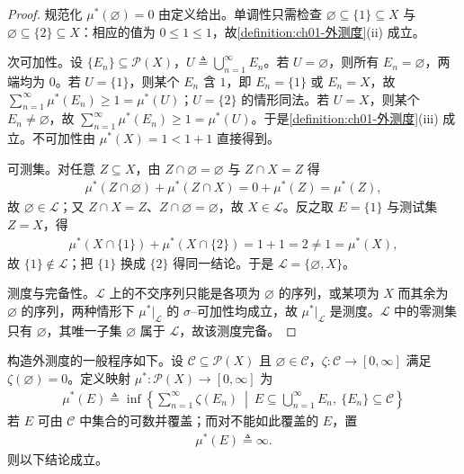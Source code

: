 \documentclass[../../main.tex]{subfiles}%
\begin{document}
\begin{proof}
规范化 $\mu^*(\varnothing )=0$ 由定义给出。单调性只需检查 $\varnothing\subseteq\{1\}\subseteq X$ 与 $\varnothing\subseteq\{2\}\subseteq X$：相应的值为 $0\leqslant 1\leqslant 1$，故\cref{definition:ch01-外测度}(ii) 成立。

次可加性。设 $\{E_n\}\subseteq\mathcal{P}(X)$，$U\triangleq\bigcup_{n=1}^\infty E_n$。若 $U=\varnothing$，则所有 $E_n=\varnothing$，两端均为 $0$。若 $U=\{1\}$，则某个 $E_n$ 含 $1$，即 $E_n=\{1\}$ 或 $E_n=X$，故 $\sum_{n=1}^\infty\mu^*(E_n)\geqslant 1=\mu^*(U)$；$U=\{2\}$ 的情形同法。若 $U=X$，则某个 $E_n\neq\varnothing$，故 $\sum_{n=1}^\infty\mu^*(E_n)\geqslant 1=\mu^*(U)$。于是\cref{definition:ch01-外测度}(iii) 成立。不可加性由 $\mu^*(X)=1<1+1$ 直接得到。

可测集。对任意 $Z\subseteq X$，由 $Z\cap\varnothing=\varnothing$ 与 $Z\cap X=Z$ 得
\begin{align*}
\mu^*(Z\cap\varnothing )+\mu^*(Z\cap X)=0+\mu^*(Z)=\mu^*(Z),
\end{align*}
故 $\varnothing\in\mathcal{L}$；又 $Z\cap X=Z$、$Z\cap\varnothing=\varnothing$，故 $X\in\mathcal{L}$。反之取 $E=\{1\}$ 与测试集 $Z=X$，得
\begin{align*}
\mu^*(X\cap\{1\})+\mu^*(X\cap\{2\})=1+1=2\neq 1=\mu^*(X),
\end{align*}
故 $\{1\}\notin\mathcal{L}$；把 $\{1\}$ 换成 $\{2\}$ 得同一结论。于是 $\mathcal{L}=\{\varnothing ,X\}$。

测度与完备性。$\mathcal{L}$ 上的不交序列只能是各项为 $\varnothing$ 的序列，或某项为 $X$ 而其余为 $\varnothing$ 的序列，两种情形下 $\mu^*|_{\mathcal{L}}$ 的 $\sigma$--可加性均成立，故 $\mu^*|_{\mathcal{L}}$ 是测度。$\mathcal{L}$ 中的零测集只有 $\varnothing$，其唯一子集 $\varnothing$ 属于 $\mathcal{L}$，故该测度完备。
\end{proof}

构造外测度的一般程序如下。设 $\mathcal{C}\subseteq\mathcal{P}(X)$ 且 $\varnothing\in\mathcal{C}$，$\zeta:\mathcal{C}\to[0,\infty]$ 满足 $\zeta(\varnothing )=0$。定义映射 $\mu^*:\mathcal{P}(X)\to[0,\infty]$ 为
\begin{align}
\mu^*(E)\triangleq\inf\left\{\sum_{n=1}^\infty\zeta(E_n)\ \middle|\ E\subseteq\bigcup_{n=1}^\infty E_n,\ \{E_n\}\subseteq\mathcal{C}\right\}\label{align:ch01-外测度生成a}
\end{align}
若 $E$ 可由 $\mathcal{C}$ 中集合的可数并覆盖；而对不能如此覆盖的 $E$，置
\begin{align}
\mu^*(E)\triangleq\infty.\label{align:ch01-外测度生成b}
\end{align}
则以下结论成立。
\end{document}
